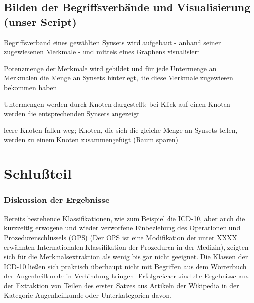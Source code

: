 \documentclass[pagesize,DIV=calc,12pt,draft]{scrreprt}
\begin{document}
\section{Bilden der Begriffsverbände und Visualisierung (unser Script)}

\begin{inparaenum}
\item Begriffsverband eines gewählten Synsets wird aufgebaut - anhand seiner zugewiesenen Merkmale - und mittels eines Graphens visualisiert

\item  Potenzmenge der Merkmale wird gebildet und für jede Untermenge an Merkmalen die Menge an Synsets hinterlegt, die diese Merkmale zugewiesen bekommen haben

\item  Untermengen werden durch Knoten dargestellt; bei Klick auf einen Knoten werden die entsprechenden Synsets angezeigt

\item leere Knoten fallen weg; Knoten, die sich die gleiche Menge an Synsets teilen, werden zu einem Knoten zusammengefügt (Raum sparen)
\end{inparaenum}

\chapter{Schlußteil}

\subsection{Diskussion der Ergebnisse}

Bereits bestehende Klassifikationen, wie zum Beispiel die ICD-10, aber auch die kurzzeitig erwogene und wieder verworfene Einbeziehung des Operationen und Prozedurenschlüssels (OPS) (Der OPS ist eine Modifikation der unter XXXX erwähnten Internationalen Klassifikation der Prozeduren in der Medizin), zeigten sich für die Merkmalsextraktion als wenig bis gar nicht geeignet. 
Die Klassen der ICD-10 ließen sich praktisch überhaupt nicht mit Begriffen aus dem Wörterbuch der Augenheilkunde in Verbindung bringen. 
Erfolgreicher sind die Ergebnisse aus der Extraktion von Teilen des ersten Satzes aus Artikeln der Wikipedia in der Kategorie Augenheilkunde oder Unterkategorien davon. 
\end{document}
